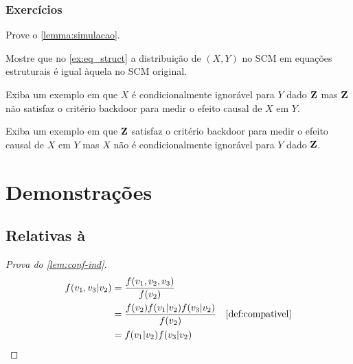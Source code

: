 \subsection{Exercícios}

\begin{exercise}
 Prove o \cref{lemma:simulacao}.
\end{exercise}

\begin{exercise}
 Mostre que no \cref{ex:eq_struct} 
 a distribuição de $(X,Y)$ no SCM 
 em equações estruturais é igual 
 àquela no SCM original.
\end{exercise}

\begin{exercise}
 Exiba um exemplo em que
 $X$ é condicionalmente ignorável para $Y$ dado ${\mathbf{Z}}$ mas
 ${\mathbf{Z}}$ não satisfaz o critério backdoor para
 medir o efeito causal de $X$ em $Y$.
\end{exercise}

\begin{exercise}
 Exiba um exemplo em que
 ${\mathbf{Z}}$ satisfaz o critério backdoor para
 medir o efeito causal de $X$ em $Y$ mas
 $X$ não é condicionalmente ignorável para $Y$ dado ${\mathbf{Z}}$.
\end{exercise}





\appendix

\chapter{Demonstrações}

\section{Relativas à }

\begin{proof}[Prova do \cref{lem:conf-ind}]
 \begin{align*}
  f(v_1,v_3|v_2) 
  &= \frac{f(v_1,v_2,v_3)}{f(v_2)} \\
  &= \frac{f(v_2)f(v_1|v_2)f(v_3|v_2)}{f(v_2)} 
  & \text{\cref{def:compativel}} \\
  &= f(v_1|v_2)f(v_3|v_2)
 \end{align*}
\end{proof}

